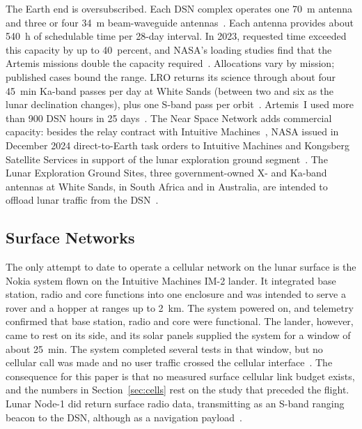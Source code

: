 \documentclass{IEEEoj}
\begin{document}
The Earth end is oversubscribed. Each DSN complex operates one \SI{70}{m} antenna and three or four \SI{34}{m} beam-waveguide antennas~\cite{dsn810005_101I,dsn810005_103F,dsn_34m_bwg}. Each antenna provides about \SI{540}{h} of schedulable time per 28-day interval. In 2023, requested time exceeded this capacity by up to 40~percent, and NASA's loading studies find that the Artemis missions double the capacity required~\cite{oig_ig23016}. Allocations vary by mission; published cases bound the range. LRO returns its science through about four \SI{45}{min} Ka-band passes per day at White Sands (between two and six as the lunar declination changes), plus one S-band pass per orbit~\cite{pds_lro_rss}. Artemis~I used more than 900 DSN hours in 25 days~\cite{oig_ig23016}. The Near Space Network adds commercial capacity: besides the relay contract with Intuitive Machines~\cite{nasa_im_contract}, NASA issued in December 2024 direct-to-Earth task orders to Intuitive Machines and Kongsberg Satellite Services in support of the lunar exploration ground segment~\cite{nasa_c24047}. The Lunar Exploration Ground Sites, three government-owned X- and Ka-band antennas at White Sands, in South Africa and in Australia, are intended to offload lunar traffic from the DSN~\cite{legs_brochure_r25,oig_ig23016}.

\subsection{Surface Networks}
The only attempt to date to operate a cellular network on the lunar surface is the Nokia system flown on the Intuitive Machines IM-2 lander. It integrated base station, radio and core functions into one enclosure and was intended to serve a rover and a hopper at ranges up to \SI{2}{km}. The system powered on, and telemetry confirmed that base station, radio and core were functional. The lander, however, came to rest on its side, and its solar panels supplied the system for a window of about \SI{25}{min}. The system completed several tests in that window, but no cellular call was made and no user traffic crossed the cellular interface~\cite{nokia_im2_outcome}. The consequence for this paper is that no measured surface cellular link budget exists, and the numbers in Section~\ref{sec:cells} rest on the study that preceded the flight. Lunar Node-1 did return surface radio data, transmitting as an S-band ranging beacon to the DSN, although as a navigation payload~\cite{nasa_ln1}.
\end{document}
